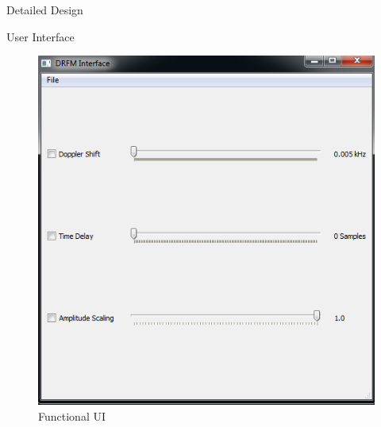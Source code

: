 \begin{frame}{Detailed Design} 
\begin{block}{User Interface }
	\action<+->  {\begin{figure}[h!]
			\centering
			\includegraphics[scale = 0.43]{images/UI}
			\caption{Functional UI}
	\end{figure}}
\end{block}
\end{frame}	


